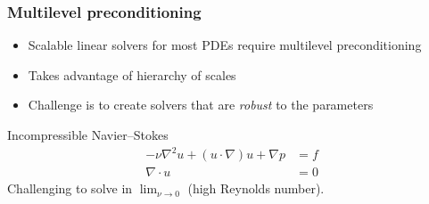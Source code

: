 \documentclass[presentation, 10pt]{beamer}
\begin{document}
\begin{frame}
  \frametitle{Multilevel preconditioning}
  \begin{itemize}
  \item Scalable linear solvers for most PDEs require multilevel
    preconditioning
  \item Takes advantage of hierarchy of scales
  \item Challenge is to create solvers that are \emph{robust} to the parameters
  \end{itemize}

  \begin{block}{Incompressible Navier--Stokes}
    \begin{align*}
      - \nu \nabla^2 u + (u \cdot \nabla) u + \nabla p &= f\\
      \nabla \cdot u &= 0 
    \end{align*}
    Challenging to solve in $\lim_{\nu \to 0}$ (high Reynolds number).
  \end{block}
\end{frame}
\end{document}
